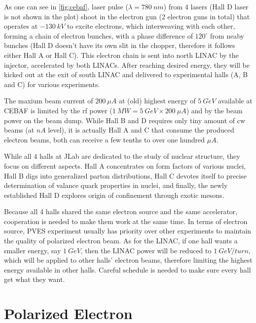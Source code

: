 As one can see in \ref{fig:cebaf}, laser pulse ($\lambda = 780 \ nm$) from 4 lasers 
(Hall D laser is not shown in the plot) shoot in the electron gun 
(2 electron guns in total) that 
operates at $-130\ kV$ to excite electrons, which interweaving with each other, 
forming a chain of electron bunches, with a phase difference of $120^\circ$ from 
neaby bunches (Hall D doesn't have its own slit in the chopper, therefore 
it follows either Hall A or Hall C). This electron chain is sent into north LINAC
by the injector, accelerated by both LINACs. After reaching desired energy,
they will be kicked out at the exit of south LINAC and delivered to experimental
halls (A, B and C) for various experiments. 

The maxium beam current of $200\ \mu A$ at (old) highest energy of $5\ GeV$ 
available at CEBAF is limited by the rf power ($1\ MW = 5\ GeV \times 200\ \mu A$) 
and by the beam power on the beam dump. While Hall B and D requires only tiny 
amount of cw beams (at $nA$ level), it is actually Hall A and C that consume 
the produced electron beams, both can receive a few tenths to over one 
hundred $\mu A$.

While all 4 halls at JLab are dedicated to the study of nuclear structure, they
focus on different aspects. Hall A concentrates on form factors of various nuclei, 
Hall B digs into generalized parton distributions, Hall C devotes itself to precise
determination of valance quark properties in nuclei, and finally, the newly 
established Hall D explores origin of confinement through exotic mesons.

Because all 4 halls shared the same electron source and the same accelerator, 
cooperation is needed to make them work at the same time. In terms of electron
source, PVES experiment usually has priority over other experiments to maintain 
the quality of polarized electron beam. As for the LINAC, if one hall wants
a smaller energy, say $1\ GeV$, then the LINAC power will be reduced to $1\ GeV/turn$,
which will be applied to other halls' electron beams, therefore limiting the 
highest energy available in other halls. Careful schedule is needed to make sure
every hall get what they want.
\section{Polarized Electron}

